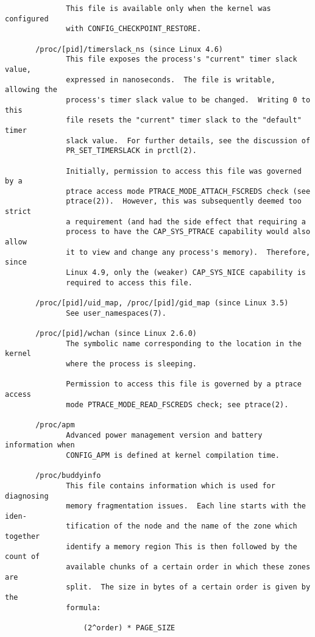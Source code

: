 \documentclass[]{article}
\begin{document}
\begin{verbatim}
              This file is available only when the kernel was configured
              with CONFIG_CHECKPOINT_RESTORE.

       /proc/[pid]/timerslack_ns (since Linux 4.6)
              This file exposes the process's "current" timer slack value,
              expressed in nanoseconds.  The file is writable, allowing the
              process's timer slack value to be changed.  Writing 0 to this
              file resets the "current" timer slack to the "default" timer
              slack value.  For further details, see the discussion of
              PR_SET_TIMERSLACK in prctl(2).

              Initially, permission to access this file was governed by a
              ptrace access mode PTRACE_MODE_ATTACH_FSCREDS check (see
              ptrace(2)).  However, this was subsequently deemed too strict
              a requirement (and had the side effect that requiring a
              process to have the CAP_SYS_PTRACE capability would also allow
              it to view and change any process's memory).  Therefore, since
              Linux 4.9, only the (weaker) CAP_SYS_NICE capability is
              required to access this file.

       /proc/[pid]/uid_map, /proc/[pid]/gid_map (since Linux 3.5)
              See user_namespaces(7).

       /proc/[pid]/wchan (since Linux 2.6.0)
              The symbolic name corresponding to the location in the kernel
              where the process is sleeping.

              Permission to access this file is governed by a ptrace access
              mode PTRACE_MODE_READ_FSCREDS check; see ptrace(2).

       /proc/apm
              Advanced power management version and battery information when
              CONFIG_APM is defined at kernel compilation time.

       /proc/buddyinfo
              This file contains information which is used for diagnosing
              memory fragmentation issues.  Each line starts with the iden‐
              tification of the node and the name of the zone which together
              identify a memory region This is then followed by the count of
              available chunks of a certain order in which these zones are
              split.  The size in bytes of a certain order is given by the
              formula:

                  (2^order) * PAGE_SIZE


\end{verbatim}
\end{document}
